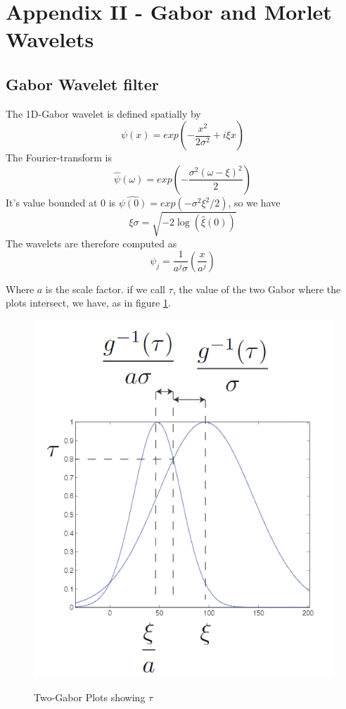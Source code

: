 \section*{Appendix II - Gabor and Morlet Wavelets}
\subsection*{Gabor Wavelet filter}
The 1D-Gabor wavelet is defined spatially by
\begin{equation}
    \psi(x)=exp\left(-\frac{x^2}{2\sigma^2}+i\xi x\right)
    \label{eqn_app2_wfil00}
\end{equation}
The Fourier-transform is
\begin{equation}
    \hat{\psi}(\omega)=exp\left(-\frac{\sigma^2(\omega-\xi)^2}{2}\right)
    \label{eqn_app2_wfil01}
\end{equation}
It's value bounded at 0 is $\hat{\psi(0)}=exp(-\sigma^2\xi^2/2)$, so we have
\begin{equation}
    \xi\sigma=\sqrt{-2\log(\hat{\xi}(0))}
    \label{eqn_app2_wfil02}
\end{equation}
The wavelets are therefore computed as 
\begin{equation}
    \psi_j=\frac{1}{a^j\sigma}\left(\frac{x}{a^j}\right)
    \label{eqn_app2_wfil03}
\end{equation}

Where $a$ is the scale factor.  if we call $\tau$, the value of the two Gabor where the plots intersect, we have, as in figure \ref{fig_app2_gab}.
\begin{figure}
\centering
  \includegraphics[width=14cm]{thesis/images/gab}\\
  \caption{Two-Gabor Plots showing $\tau$} \label{fig_app2_gab}
\end{figure}